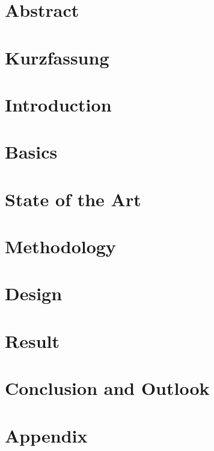 




\tableofcontents
    

\chapter*{Abstract} 


\chapter*{Kurzfassung}

\chapter{Introduction} 


\chapter{Basics}  \label{chap:basics}  %


\chapter{State of the Art} \label{chap:soa}


\chapter{Methodology} %



\chapter{Design}    



\chapter{Result} %



\chapter{Conclusion and Outlook} %


\chapter{Appendix}

    
